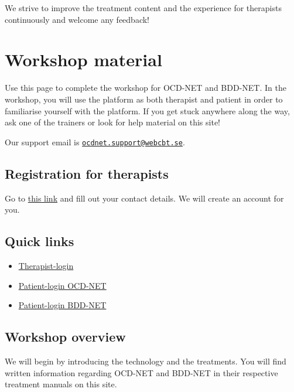 \documentclass[]{book}
\providecommand{\tightlist}{%
  \setlength{\itemsep}{0pt}\setlength{\parskip}{0pt}}
\begin{document}
We strive to improve the treatment content and the experience for therapists continuously and welcome any feedback!

\hypertarget{workshop-material}{%
\chapter{Workshop material}\label{workshop-material}}

Use this page to complete the workshop for OCD-NET and BDD-NET. In the workshop, you will use the platform as both therapist and patient in order to familiarise yourself with the platform. If you get stuck anywhere along the way, ask one of the trainers or look for help material on this site!

Our support email is \href{mailto:ocdnet.support@webcbt.se}{\nolinkurl{ocdnet.support@webcbt.se}}.

\hypertarget{registration-for-therapists}{%
\section{Registration for therapists}\label{registration-for-therapists}}

Go to \href{https://tinyurl.com/ocdnet-register}{this link} and fill out your contact details. We will create an account for you.

\hypertarget{quick-links}{%
\section{Quick links}\label{quick-links}}

\begin{itemize}
\tightlist
\item
  \href{https://webcbt.se/ocdnet}{Therapist-login}\\
\item
  \href{https://ocdnet.webcbt.se}{Patient-login OCD-NET}\\
\item
  \href{https://bddnet.webcbt.se}{Patient-login BDD-NET}
\end{itemize}

\hypertarget{workshop-overview}{%
\section{Workshop overview}\label{workshop-overview}}

We will begin by introducing the technology and the treatments. You will find written information regarding OCD-NET and BDD-NET in their respective treatment manuals on this site.
\end{document}
